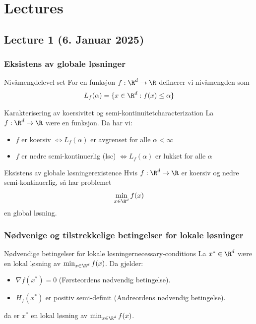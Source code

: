 \chapter{Lectures}
\clearpage

\section{Lecture 1 (6. Januar 2025)}

\subsection*{Eksistens av globale løsninger}

\begin{definition}{Nivåmengde}{level-set}
	For en funksjon  \(f: \R^d \to \R\) definerer vi nivåmengden som
	\[
		L_f(\alpha) = \{x \in \R^d : f(x) \leq \alpha\}
	\]
\end{definition}

\begin{theorem}{Karakterisering av koersivitet og semi-kontinuitet}{characterization}
	La  \(f: \R^d \to \R\) være en funksjon. Da har vi:
	\begin{itemize}
		\item  \(f\) er koersiv  \(\iff L_f(\alpha)\) er avgrenset for alle  \(\alpha < \infty\)
		\item  \(f\) er nedre semi-kontinuerlig (lsc)  \(\iff L_f(\alpha)\) er lukket for alle  \(\alpha\)
	\end{itemize}
\end{theorem}

\begin{theorem}{Eksistens av globale løsninger}{existence}
	Hvis  \(f: \R^d \to \R\) er koersiv og nedre semi-kontinuerlig, så har problemet
	\[
		\min_{x \in \R^d} f(x)
	\]
	en global løsning.
\end{theorem}

\subsection*{Nødvenige og tilstrekkelige betingelser for lokale løsninger}

\begin{theorem}{Nødvendige betingelser for lokale løsninger}{necessary-conditions}
	La  \(x^* \in \R^d\) være en lokal løsning av  \(\min_{x \in \R^d} f(x)\). Da gjelder:
	\begin{itemize}
		\item  \(\nabla f(x^*) = 0\) (Førsteordens nødvendig betingelse).
		\item  \(H_f(x^*)\) er positiv semi-definit (Andreordens nødvendig betingelse).
	\end{itemize}
	da er \(x^*\) en lokal løsning av  \(\min_{x \in \R^d} f(x)\).
\end{theorem}

